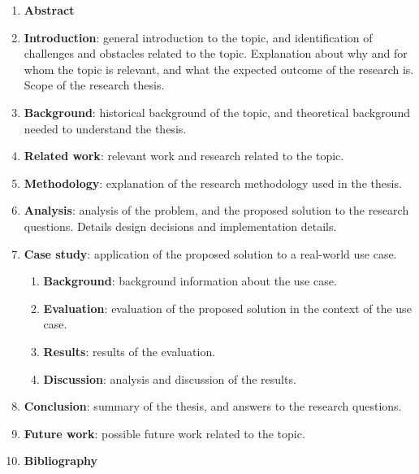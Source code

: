 \documentclass[12pt]{article}
\begin{document}
	\begin{enumerate}
		\item \textbf{Abstract}
		\item \textbf{Introduction}: general introduction to the topic, and identification of challenges and obstacles related to the topic.
		Explanation about why and for whom the topic is relevant, and what the expected outcome of the research is.
		Scope of the research thesis.
		\item \textbf{Background}: historical background of the topic, and theoretical background needed to understand the thesis.
		\item \textbf{Related work}: relevant work and research related to the topic.
		\item \textbf{Methodology}: explanation of the research methodology used in the thesis.
		\item \textbf{Analysis}: analysis of the problem, and the proposed solution to the research questions.
		Details design decisions and implementation details.
		\item \textbf{Case study}: application of the proposed solution to a real-world use case.
			\begin{enumerate}
				\item \textbf{Background}: background information about the use case.
				\item \textbf{Evaluation}: evaluation of the proposed solution in the context of the use case.
				\item \textbf{Results}: results of the evaluation.
				\item \textbf{Discussion}: analysis and discussion of the results.
			\end{enumerate}
		\item \textbf{Conclusion}: summary of the thesis, and answers to the research questions.
		\item \textbf{Future work}: possible future work related to the topic.
		\item \textbf{Bibliography}
	\end{enumerate}

	\clearpage


	\nocite{*}

	\printbibliography
\end{document}
